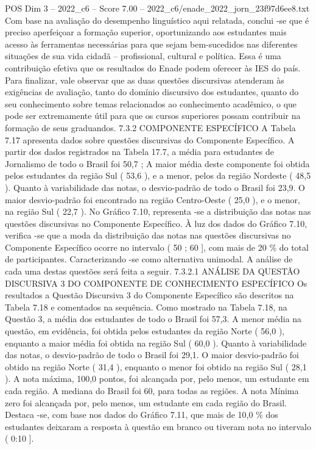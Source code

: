 \begin{textsample}{POS Dim 3 – 2022\_c6 – Score 7.00 – 2022\_c6/enade\_2022\_jorn\_23f97d6ee8.txt}
Com base na avaliação do desempenho linguístico aqui relatada, conclui -se que é preciso aperfeiçoar a formação superior, oportunizando aos estudantes mais acesso às ferramentas necessárias para que sejam bem-sucedidos nas diferentes situações de sua vida cidadã – profissional, cultural e política.
Essa é uma contribuição efetiva que os resultados do Enade podem oferecer às IES do país.
Para finalizar, vale observar que as duas questões discursivas atenderam às exigências de avaliação, tanto do domínio discursivo dos estudantes, quanto do seu conhecimento sobre temas relacionados ao conhecimento acadêmico, o que pode ser extremamente útil para que os cursos superiores possam contribuir na formação de seus graduandos. 7.3.2 COMPONENTE ESPECÍFICO A Tabela 7.17 apresenta dados sobre questões discursivas do Componente Específico.
A partir dos dados registrados na Tabela 17.7, a média para estudantes de Jornalismo de todo o Brasil foi 50,7 ; A maior média deste componente foi obtida pelos estudantes da região Sul ( 53,6 ), e a menor, pelos da região Nordeste ( 48,5 ).
Quanto à variabilidade das notas, o desvio-padrão de todo o Brasil foi 23,9.
O maior desvio-padrão foi encontrado na região Centro-Oeste ( 25,0 ), e o menor, na região Sul ( 22,7 ).
No Gráfico 7.10, representa -se a distribuição das notas nas questões discursivas no Componente Específico.
À luz dos dados do Gráfico 7.10, verifica -se que a moda da distribuição das notas nas questões discursivas no Componente Específico ocorre no intervalo ( 50 ; 60 ], com mais de 20 \% do total de participantes.
Caracterizando -se como alternativa unimodal.
A análise de cada uma destas questões será feita a seguir. 7.3.2.1 ANÁLISE DA QUESTÃO DISCURSIVA 3 DO COMPONENTE DE CONHECIMENTO ESPECÍFICO Os resultados a Questão Discursiva 3 do Componente Específico são descritos na Tabela 7.18 e comentados na sequência.
Como mostrado na Tabela 7.18, na Questão 3, a média dos estudantes de todo o Brasil foi 57,3.
A menor média na questão, em evidência, foi obtida pelos estudantes da região Norte ( 56,0 ), enquanto a maior média foi obtida na região Sul ( 60,0 ).
Quanto à variabilidade das notas, o desvio-padrão de todo o Brasil foi 29,1.
O maior desvio-padrão foi obtido na região Norte ( 31,4 ), enquanto o menor foi obtido na região Sul ( 28,1 ).
A nota máxima, 100,0 pontos, foi alcançada por, pelo menos, um estudante em cada região.
A mediana do Brasil foi 60, para todas as regiões.
A nota Mínima zero foi alcançada por, pelo menos, um estudante em cada região do Brasil.
Destaca -se, com base nos dados do Gráfico 7.11, que mais de 10,0 \% dos estudantes deixaram a resposta à questão em branco ou tiveram nota no intervalo ( 0:10 ].

\end{textsample}
